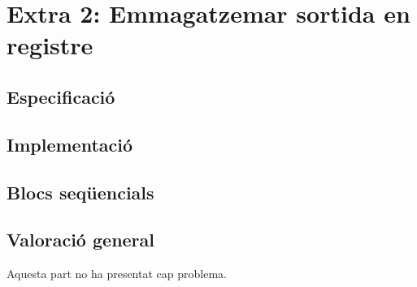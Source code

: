 \chapter{Extra 2: Emmagatzemar sortida en registre}

\section{Especificació}

\section{Implementació}


\section{Blocs seqüencials}

\section{Valoració general}

Aquesta part no ha presentat cap problema.
